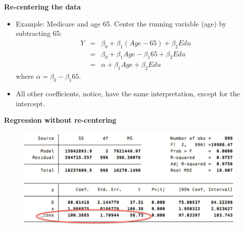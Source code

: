 \documentclass[notes=show]{beamer}
\begin{document}
\begin{frame}[plain]

\begin{center}
	\textbf{Re-centering the data}
\end{center}

\begin{itemize}
	\item Example: Medicare and age 65.  Center the running variable (age) by subtracting 65:
		\begin{eqnarray*}
		Y &=& \beta_0 + \beta_1(Age-65) + \beta_2 Edu \\
		&=& \beta_0 + \beta_1 Age - \beta_1 65 + \beta_2 Edu \\
		&=& \alpha + \beta_1 Age + \beta_2 Edu
		\end{eqnarray*}where $\alpha=\beta_0 - \beta_1 65$.  
		\item All other coefficients, notice, have the same interpretation, except for the intercept.
\end{itemize}

\end{frame}

\begin{frame}[plain]
\begin{center}
\textbf{Regression without re-centering}
\end{center}

 

\end{frame}


\begin{frame}[plain]

	\begin{figure}
	\includegraphics[scale=0.15]{./lecture_includes/centering1.png}
	\end{figure}

\end{frame}
\end{document}
